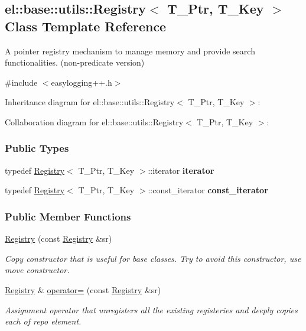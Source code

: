 \hypertarget{a00073}{}\subsection{el\+:\+:base\+:\+:utils\+:\+:Registry$<$ T\+\_\+\+Ptr, T\+\_\+\+Key $>$ Class Template Reference}
\label{a00073}


A pointer registry mechanism to manage memory and provide search functionalities. (non-\/predicate version)  




{\ttfamily \#include $<$easylogging++.\+h$>$}



Inheritance diagram for el\+:\+:base\+:\+:utils\+:\+:Registry$<$ T\+\_\+\+Ptr, T\+\_\+\+Key $>$\+:


Collaboration diagram for el\+:\+:base\+:\+:utils\+:\+:Registry$<$ T\+\_\+\+Ptr, T\+\_\+\+Key $>$\+:
\subsubsection*{Public Types}
\begin{DoxyCompactItemize}
\item 
\hypertarget{a00073_a31f3d725285e6b65f1f9e990066f96ed}{}typedef \hyperlink{a00073}{Registry}$<$ T\+\_\+\+Ptr, T\+\_\+\+Key $>$\+::iterator {\bfseries iterator}\label{a00073_a31f3d725285e6b65f1f9e990066f96ed}

\item 
\hypertarget{a00073_a955e62adc74c60d0205b52a3fc430cef}{}typedef \hyperlink{a00073}{Registry}$<$ T\+\_\+\+Ptr, T\+\_\+\+Key $>$\+::const\+\_\+iterator {\bfseries const\+\_\+iterator}\label{a00073_a955e62adc74c60d0205b52a3fc430cef}

\end{DoxyCompactItemize}
\subsubsection*{Public Member Functions}
\begin{DoxyCompactItemize}
\item 
\hypertarget{a00073_adf5e97aa801be3b93e116ad645304759}{}\hyperlink{a00073_adf5e97aa801be3b93e116ad645304759}{Registry} (const \hyperlink{a00073}{Registry} \&sr)\label{a00073_adf5e97aa801be3b93e116ad645304759}

\begin{DoxyCompactList}\small\item\em Copy constructor that is useful for base classes. Try to avoid this constructor, use move constructor. \end{DoxyCompactList}\item 
\hyperlink{a00073}{Registry} \& \hyperlink{a00073_a80e0ce12b7d0c24462b385fc7b3149e0}{operator=} (const \hyperlink{a00073}{Registry} \&sr)
\begin{DoxyCompactList}\small\item\em Assignment operator that unregisters all the existing registeries and deeply copies each of repo element. \end{DoxyCompactList}\end{DoxyCompactItemize}
